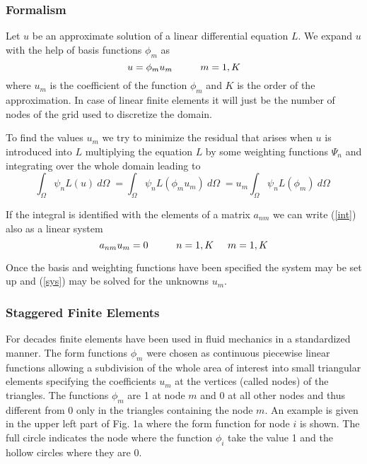 \subsubsection{Formalism}

Let $u$ be an approximate solution of a linear differential
equation $L$. We expand $u$ with the help of basis functions $\phi_{m}$
as
\begin{equation}
\label{exp}
	u=\phi_{m} u_{m} \mbox{\hspace{1cm}} m=1,K
\end{equation}
where $u_{m}$ is the coefficient of the function $\phi_{m}$ and $K$
is the order of the approximation.
In case of linear finite
elements it will just be the number of nodes of the grid used to
discretize the domain.

To find the values $u_{m}$ we try to minimize the residual
that arises when $u$ is introduced into $L$ multiplying the equation $L$
by some weighting functions $\Psi_{n}$ and
integrating over the whole domain leading to
\begin{equation}
\label{int}
\int_{\Omega} \psi_{n} L(u) \: d\Omega \; = 
\int_{\Omega} \psi_{n} L(\phi_{m} u_{m}) \: d\Omega \;
= u_{m} \int_{\Omega} \psi_{n} L(\phi_{m}) \: d\Omega \;
\end{equation}

If the integral is identified with the elements of a matrix $a_{nm}$
we can write (\ref{int}) also as a linear system
\begin{equation} \label{sys}
	a_{nm}u_{m} = 0 \mbox{\hspace{1cm}} n=1,K \hspace{0.5cm} m=1,K
\end{equation}

Once the basis and weighting functions have been specified the system
may be set up and (\ref{sys}) may be solved for the unknowns $u_{m}$.






\subsubsection{Staggered Finite Elements}

For decades finite elements have been used in fluid mechanics in
a standardized manner.
The form functions $\phi_{m}$ were chosen as continuous piecewise linear
functions allowing a subdivision of the whole area of interest into small
triangular elements specifying the coefficients $u_{m}$ at the vertices
(called nodes)
of the triangles. The functions $\phi_{m}$ are 1 at node
$m$ and 0 at all other nodes and thus different from 0 only in the
triangles containing the node $m$.
An example is given in the upper left part of Fig. 1a
where the form function for node $i$ is shown. The full circle indicates
the node where the function $\phi_{i}$ take the value
1 and the hollow circles where they are 0.


